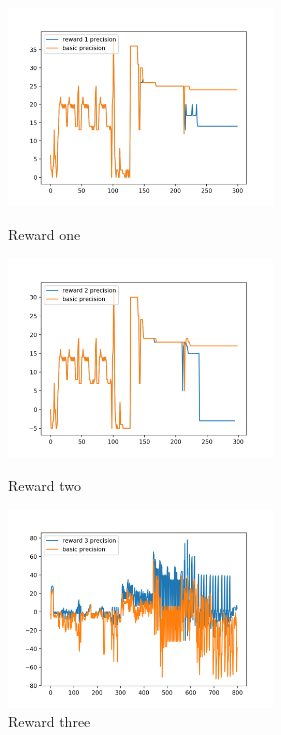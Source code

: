 \begin{figure}[!h]
  \includegraphics[width=7cm]{figures/r1}
  \caption{Reward one}\label{fig:r1}
\endminipage\hfill
{}
  \includegraphics[width=7cm]{figures/r2}
  \caption{Reward two}\label{fig:r2}
\endminipage\hfill
{}%
  \includegraphics[width=7cm]{figures/r3}
  \caption{Reward three}\label{fig:r3}
\endminipage
\end{figure}

